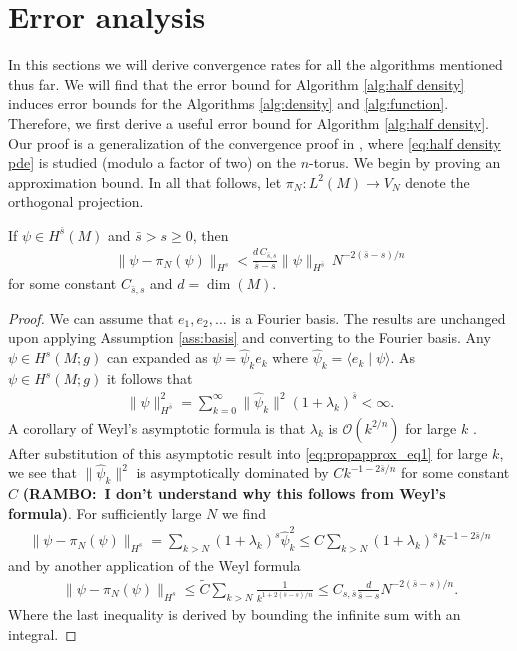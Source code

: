 \documentclass[final,leqno]{siamltex1213}
\newcommand{\ram}[1]{{\normalsize{\textbf{({\color{red}RAMBO:\ }#1)}}}}
\begin{document}
\section{Error analysis} \label{sec:analysis}
In this sections we will derive convergence rates for all the algorithms mentioned thus far.
We will find that the error bound for Algorithm \ref{alg:half density} induces error bounds for the Algorithms \ref{alg:density} and \ref{alg:function}.
Therefore, we first derive a useful error bound for Algorithm \ref{alg:half density}.
Our proof is a generalization of the convergence proof in \cite{Pasciak1980}, where \eqref{eq:half density pde} is studied (modulo a factor of two) on the $n$-torus.
We begin by proving an approximation bound.
In all that follows, let $\pi_{N}: L^{2}(M) \to V_{N}$ denote the orthogonal projection.

\begin{proposition} \label{prop:approximation}
	If $\psi \in H^{\bar{s}}(M)$ and $\bar{s} > s \geq 0$,
	then
	\begin{align}
		\| \psi - \pi_{N}(\psi) \|_{H^{s}} <  \frac{d \, C_{\bar{s},s} }{ \bar{s}-s} \| \psi \|_{H^{\bar{s}}} \, N^{-2(\bar{s}-s)/n}
	\end{align}
	for some constant $C_{\bar{s},s}$ and $d = \dim(M)$.
\end{proposition}
\begin{proof}
	We can assume that $e_{1},e_{2},\dots$ is a Fourier basis.
	The results are unchanged upon applying Assumption \ref{ass:basis} and converting to the Fourier basis.
	Any $\psi \in H^{s}(M;g)$ can expanded as $\psi = \hat{\psi}_{k} e_{k}$ where $\hat{\psi}_{k} = \langle e_{k} \mid \psi \rangle$.
	As $\psi \in H^{s}(M;g)$ it follows that
	\begin{align}
		\| \psi \|^{2}_{H^{\bar{s} }} = \sum_{k=0}^{\infty} \| \hat{\psi}_{k}\|^{2} (1+\lambda_{k})^{\bar{s}} < \infty.
		\label{eq:propapprox_eq1}
	\end{align}
	A corollary of Weyl's asymptotic formula is that $\lambda_{k}$ is $\mathcal{O}( k^{2/n})$ for large $k$ \cite[page 155]{Chavel1984}.
	After substitution of this asymptotic result into \eqref{eq:propapprox_eq1} for large $k$, we see that $\|\hat{\psi}_{k}\|^{2}$ is asymptotically dominated by  $C k^{-1- 2\bar{s}/n}$ for some constant $C$ \ram{I don't understand why this follows from Weyl's formula}.
	For sufficiently large $N$ we find
	\begin{align}
		\| \psi - \pi_{N}(\psi) \|_{H^{s}} = \sum_{k>N} (1+\lambda_{k})^{s} \hat{\psi}_{k}^{2} \leq C \sum_{k>N} (1+\lambda_{k})^{s} k^{-1- 2\bar{s}/n}
	\end{align}
	and by another application of the Weyl formula
	\begin{align}
		\| \psi - \pi_{N}(\psi) \|_{H^{s}} \leq \tilde{C} \sum_{k>N} \frac{1}{k^{1+2(\bar{s}-s)/n}} \leq C_{s,\bar{s}}  \frac{d }{ \bar{s}-s} N^{-2(\bar{s}-s)/n}.
	\end{align}
	Where the last inequality is derived by bounding the infinite sum with an integral.
\end{proof}
\end{document}
